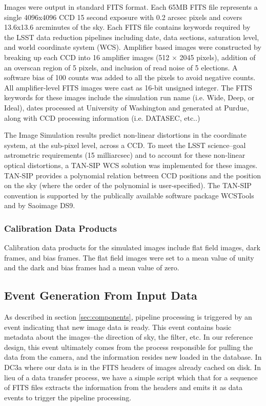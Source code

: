 Images were output in standard FITS format. Each 65MB FITS file
represents a single 4096x4096 CCD 15 second exposure with 0.2 arcsec
pixels and covers 13.6x13.6 arcminutes of the sky. Each FITS file
contains keywords required by the LSST data reduction pipelines
including date, data sections, saturation level, and world coordinate
system (WCS).  Amplifier based images were constructed by breaking up
each CCD into 16 amplifier images (512 $\times$ 2045 pixels), addition
of an overscan region of 5 pixels, and inclusion of read noise of 5
elections.  A software bias of 100 counts was added to all the pixels
to avoid negative counts.  All amplifier-level FITS images were cast
as 16-bit unsigned integer. The FITS keywords for these images include
the simulation run name (i.e. Wide, Deep, or Ideal), dates processed
at University of Washington and generated at Purdue, along with CCD
processing information (i.e. DATASEC, etc..)

The Image Simulation results predict non-linear distortions in the
coordinate system, at the sub-pixel level, across a CCD. To meet the
LSST science--goal astrometric requirements (15 milliarcsec) and to
account for these non-linear optical distortions, a TAN-SIP WCS
solution was implemented for these images. TAN-SIP provides a
polynomial relation between CCD positions and the position on the sky
(where the order of the polynomial is user-specified). The TAN-SIP
convention is supported by the publically available software package
WCSTools and by Saoimage DS9. 

\subsubsection{Calibration Data Products}

Calibration data products for the simulated images include flat field
images, dark frames, and bias frames. The flat field images were set
to a mean value of unity and the dark and bias frames had a mean value
of zero.

\subsection{Event Generation From Input Data}

As described in section \ref{sec:components}, pipeline processing is
triggered by an event indicating that new image data is
ready.  This event contains basic metadata about the images--the
direction of sky, the filter, etc.  In our reference design, this
event ultimately comes from the process responsible for pulling the
data from the camera, and the information resides new loaded in the
database.  In DC3a where our data is in the FITS headers of images
already cached on disk.  In lieu of a data transfer process, we have a
simple script which that for a sequence of FITS files extracts the
information from the headers and emits it as data events to trigger
the pipeline processing.

